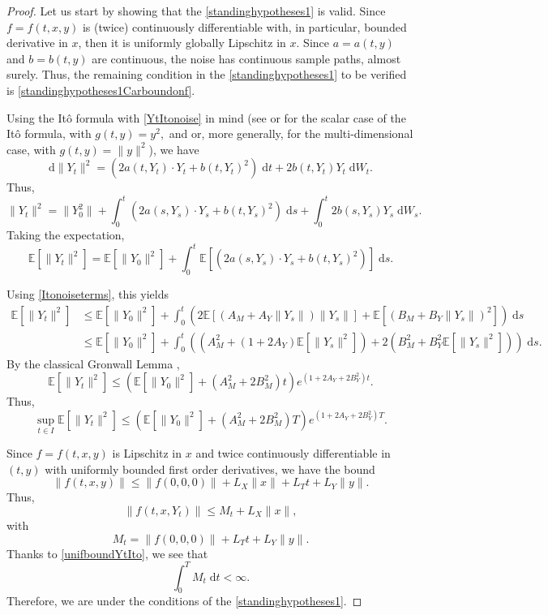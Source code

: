 \documentclass[reqno,12pt]{amsart}
\theoremstyle{plain} %
\theoremstyle{definition} %
\begin{document}
\begin{proof}
    Let us start by showing that the \cref{standinghypotheses1} is valid. Since $f=f(t, x, y)$ is (twice) continuously differentiable with, in particular, bounded derivative in $x$, then it is uniformly globally Lipschitz in $x$. Since $a=a(t, y)$ and $b=b(t, y)$ are continuous, the noise has continuous sample paths, almost surely. Thus, the remaining condition in the \cref{standinghypotheses1} to be verified is \eqref{standinghypotheses1Carboundonf}.

    Using the It\^o formula with \eqref{YtItonoise} in mind (see \cite[Theorem 4.1.2]{Oksendal2003} or \cite[Section 7.4]{Kuo2006} for the scalar case of the It\^o formula, with $g(t, y) = y^2,$ and \cite[Theorem 4.2.1]{Oksendal2003} or, more generally, \cite[Section 7.5]{Kuo2006} for the multi-dimensional case, with $g(t, y) = \|y\|^2$), we have
    \[
        \mathrm{d}\|Y_t\|^2 = \left(2a(t, Y_t) \cdot Y_t  + b(t, Y_t)^2 \right) \;\mathrm{d}t + 2b(t, Y_t) Y_t\;\mathrm{d}W_t.
    \]
    Thus,
    \[
        \|Y_t\|^2 = \|Y_0^2\| + \int_0^t \left(2a(s, Y_s)\cdot Y_s  + b(t, Y_s)^2 \right) \;\mathrm{d}s + \int_0^t 2b(s, Y_s) Y_s\;\mathrm{d}W_s.
    \]
    Taking the expectation,
    \[
        \mathbb{E}[\|Y_t\|^2] = \mathbb{E}[\|Y_0\|^2] + \int_0^t \mathbb{E}\left[\left(2a(s, Y_s) \cdot Y_s  + b(t, Y_s)^2 \right)\right] \;\mathrm{d}s.
    \]

    Using \eqref{Itonoiseterms}, this yields
    \begin{align*}
        \mathbb{E}[\|Y_t\|^2] & \leq \mathbb{E}[\|Y_0\|^2] + \int_0^t \left(2\mathbb{E}[(A_M + A_Y \|Y_s\|) \|Y_s\|]  + \mathbb{E}[(B_M + B_Y\|Y_s\|)^2] \right) \;\mathrm{d}s \\
        & \leq \mathbb{E}[\|Y_0\|^2] + \int_0^t \left((A_M^2 + (1 + 2A_Y) \mathbb{E}[\|Y_s\|^2])  + 2(B_M^2 + B_Y^2\mathbb{E}[\|Y_s\|^2]) \right) \;\mathrm{d}s.
    \end{align*}
    By the classical Gronwall Lemma \cite{Gronwall1919},
    \[
        \mathbb{E}[\|Y_t\|^2] \leq \left( \mathbb{E}[\|Y_0\|^2] + (A_M^2 + 2B_M^2)t\right)e^{(1 + 2A_Y + 2B_Y^2)t}.
    \]
    Thus,
    \begin{equation}
        \label{unifboundYtIto}
        \sup_{t\in I}\mathbb{E}[\|Y_t\|^2] \leq \left( \mathbb{E}[\|Y_0\|^2] + (A_M^2 + 2B_M^2)T\right)e^{(1 + 2A_Y + 2B_Y^2)T}.
    \end{equation}

    Since $f=f(t, x, y)$ is Lipschitz in $x$ and twice continuously differentiable in $(t, y)$ with uniformly bounded first order derivatives, we have the bound
    \[
        \|f(t, x, y)\| \leq \|f(0, 0, 0)\| + L_X\|x\| + L_T t + L_Y\|y\|.
    \]
    Thus,
    \[
        \|f(t, x, Y_t)\| \leq M_t + L_X\|x\|,
    \]
    with
    \[
        M_t = \|f(0, 0, 0)\| + L_T t + L_Y\|y\|.
    \]
    Thanks to \eqref{unifboundYtIto}, we see that
    \[
        \int_0^T M_t\;\mathrm{d}t < \infty.
    \]
    Therefore, we are under the conditions of the \cref{standinghypotheses1}.


\end{proof}
\end{document}
